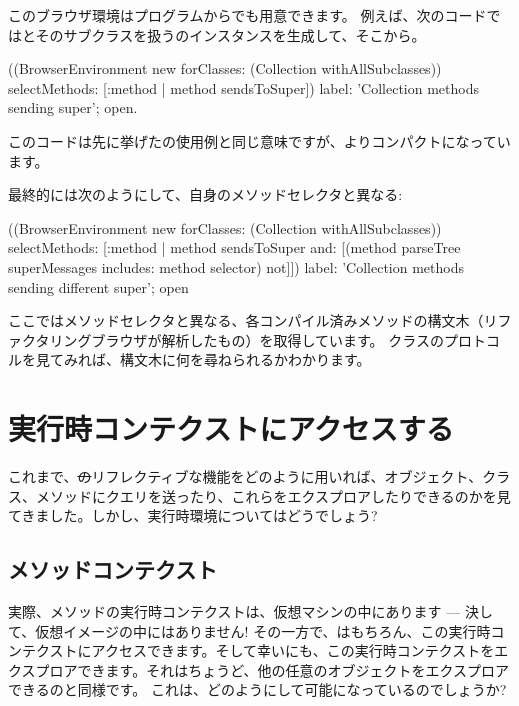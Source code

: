 \documentclass[a4paper,10pt,twoside]{book}
\begin{document}
このブラウザ環境はプログラムからでも用意できます。
例えば、次のコードではとそのサブクラスを扱うのインスタンスを生成して、そこから。
\begin{code}{}
((BrowserEnvironment new forClasses: (Collection withAllSubclasses))
	selectMethods: [:method | method sendsToSuper])
	label: 'Collection methods sending super';
	open.
\end{code}{}

このコードは先に挙げたの使用例と同じ意味ですが、よりコンパクトになっています。

最終的には次のようにして、自身のメソッドセレクタと異なる:
\begin{code}{}
((BrowserEnvironment new forClasses: (Collection withAllSubclasses))
	selectMethods: [:method | 
		method sendsToSuper
		and: [(method parseTree superMessages includes: method selector) not]])
	label: 'Collection methods sending different super';
	open
\end{code}
ここではメソッドセレクタと異なる、各コンパイル済みメソッドの構文木（リファクタリングブラウザが解析したもの）を取得しています。
クラスのプロトコルを見てみれば、構文木に何を尋ねられるかわかります。

\section{実行時コンテクストにアクセスする}

これまで、\st のリフレクティブな機能をどのように用いれば、オブジェクト、クラス、メソッドにクエリを送ったり、これらをエクスプロアしたりできるのかを見てきました。しかし、実行時環境についてはどうでしょう?

\subsection{メソッドコンテクスト}

実際、メソッドの実行時コンテクストは、仮想マシンの中にあります --- 決して、仮想イメージの中にはありません!
その一方で、はもちろん、この実行時コンテクストにアクセスできます。そして幸いにも、この実行時コンテクストをエクスプロアできます。それはちょうど、他の任意のオブジェクトをエクスプロアできるのと同様です。
これは、どのようにして可能になっているのでしょうか?
\end{document}
